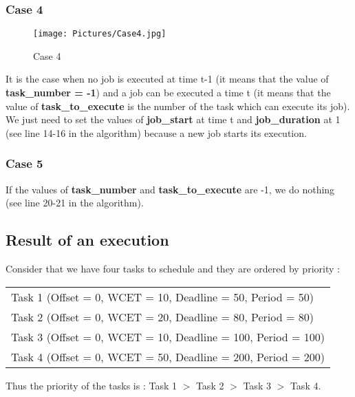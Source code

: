 \documentclass[a4paper,12pt]{article}
\begin{document}
\subsubsection{Case 4}

\begin{figure}[h!]
  \centering
  \texttt{[image: Pictures/Case4.jpg]}
  \caption{Case 4}
  \label{fig: Case 4}
\end{figure}

\smallskip
\noindent
It is the case when no job is executed at time t-1 (it means that the value of \textbf{task\_number = -1}) and a job can be executed a time t (it means that the value of \textbf{task\_to\_execute} is the number of the task which can execute its job). We just need to set the values of \textbf{job\_start} at time t and \textbf{job\_duration} at 1 (see line 14-16 in the algorithm) because a new job starts its execution.

\subsubsection{Case 5}
If the values of \textbf{task\_number} and \textbf{task\_to\_execute} are -1, we do nothing (see line 20-21 in the algorithm). 

\newpage
\subsection{Result of an execution}

Consider that we have four tasks to schedule and they are ordered by priority : \\

\smallskip
\begin{center}
\begin{tabular}{| l |}
\hline
Task 1 (Offset = 0, WCET = 10, Deadline = 50, Period = 50)\\
Task 2 (Offset = 0, WCET = 20, Deadline = 80, Period = 80)\\
Task 3 (Offset = 0, WCET = 10, Deadline = 100, Period = 100)\\
Task 4 (Offset = 0, WCET = 50, Deadline = 200, Period = 200)\\
\hline
\end{tabular}
\end{center}

\smallskip
\noindent
Thus the priority of the tasks is : Task 1 $>$ Task 2 $>$ Task 3 $>$ Task 4. \\
\end{document}
